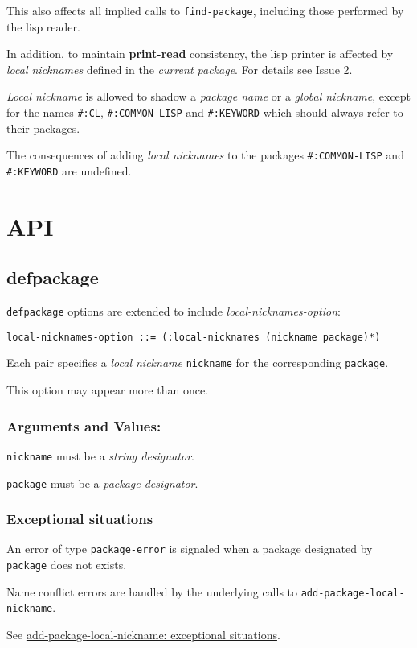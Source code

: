 \documentclass[11pt]{article}
\begin{document}
This also affects all implied calls to \texttt{find-package}, including those performed by
the lisp reader.

In addition, to maintain \textbf{print-read} consistency, the lisp printer is affected by
\emph{local nicknames} defined in the \emph{current package}.
For details see Issue 2.

\emph{Local nickname} is allowed to shadow a \emph{package name} or a \emph{global nickname},
except for the names \texttt{\#:CL}, \texttt{\#:COMMON-LISP} and \texttt{\#:KEYWORD} which should always
refer to their packages.

The consequences of adding \emph{local nicknames} to the packages \texttt{\#:COMMON-LISP} and
\texttt{\#:KEYWORD} are undefined.
\section{API}
\label{sec:org72b40be}
\subsection{defpackage}
\label{sec:orga7fab27}
\texttt{defpackage} options are extended to include \emph{local-nicknames-option}:
\begin{verbatim}
local-nicknames-option ::= (:local-nicknames (nickname package)*)
\end{verbatim}


Each pair specifies a \emph{local nickname} \texttt{nickname} for the corresponding \texttt{package}.

This option may appear more than once.
\subsubsection{Arguments and Values:}
\label{sec:org8f76976}
\texttt{nickname} must be a \emph{string designator}.

\texttt{package} must be a \emph{package designator}.
\subsubsection{Exceptional situations}
\label{sec:org5ac218c}
An error of type \texttt{package-error} is signaled when a package designated by
\texttt{package} does not exists.

Name conflict errors are handled by the underlying calls to
\texttt{add-package-local-nickname}.

See \hyperref[sec:org4b1c53c]{add-package-local-nickname: exceptional situations}.
\end{document}
